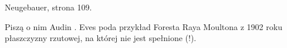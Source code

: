 \begin{proposition}
	Neugebauer, strona 109.
\end{proposition}

Piszą o nim Audin \cite[s. 26, 151]{audin_2003}.
Eves \cite[s. 362]{eves1_1972} poda przykład Foresta Raya Moultona z 1902 roku płaszczyzny rzutowej, na której nie jest spełnione (!). %
